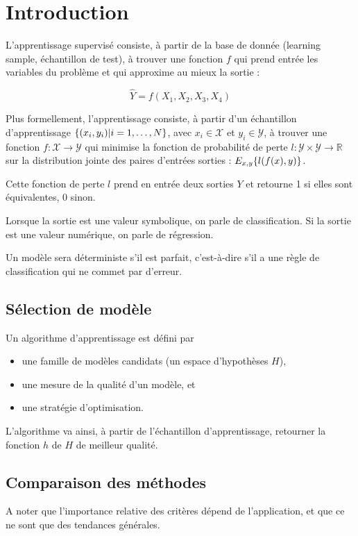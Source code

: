 \chapter{Introduction}
L'apprentissage supervisé consiste, à partir de la base de donnée (learning sample, échantillon de test), à trouver une fonction $f$ qui prend entrée les variables du problème et qui approxime au mieux la sortie :

$$\hat{Y} = f(X_1, X_2, X_3, X_4)$$

Plus formellement, l'apprentissage consiste, à partir d'un échantillon d'apprentissage $\lbrace (x_i, y_i) \vert i = 1, \dots , N \rbrace$, avec $x_i \in \mathcal{X}$ et $y_i \in \mathcal{Y}$, à trouver une fonction $f : \mathcal{X} \rightarrow \mathcal{Y}$ qui minimise la fonction de probabilité de perte $l : \mathcal{Y} \times \mathcal{Y} \rightarrow \mathbb{R}$ sur la distribution jointe des paires d'entrées sorties : $E_{x, y} \lbrace l(f(x), y) \rbrace$.

Cette fonction de perte $l$ prend en entrée deux sorties $Y$ et retourne 1 si elles sont équivalentes, 0 sinon.

Lorsque la sortie est une valeur symbolique, on parle de classification. Si la sortie est une valeur numérique, on parle de régression.

Un modèle sera déterministe s'il est parfait, c'est-à-dire s'il a une règle de classification qui ne commet par d'erreur.

\section{Sélection de modèle}

Un algorithme d'apprentissage est défini par

\begin{itemize}
	\item une famille de modèles candidats (un espace d'hypothèses $H$),
	\item une mesure de la qualité d'un modèle, et
	\item une stratégie d'optimisation.
\end{itemize}

L'algorithme va ainsi, à partir de l'échantillon d'apprentissage, retourner la fonction $h$ de $H$ de meilleur qualité.


\section{Comparaison des méthodes}
	

A noter que l'importance relative des critères dépend de l'application, et que ce ne sont que des tendances générales.
